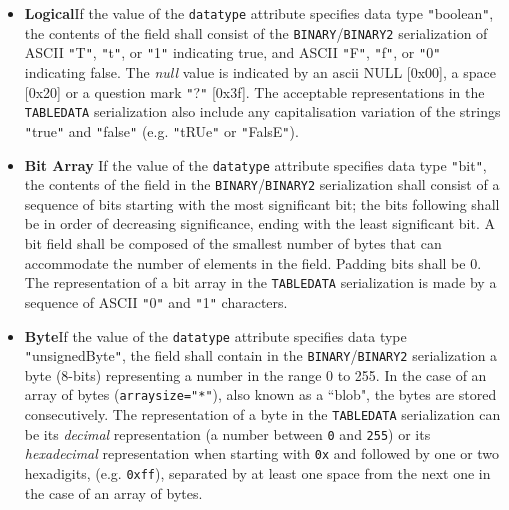 \documentclass[11pt,a4paper]{ivoa}
\let\fg=\color
\def\attr#1{{\tt{\fg{DarkRed}#1}}}
\def\elem#1{{\tt{\fg{DarkRed}#1}}}
\def\attrval#1#2{{\tt{\fg{DarkRed}#1}="{\fg{DarkPurple}#2}"}}
\def\literalvalue#1{{\tt"}{{\fg{DarkPurple}#1}}{\tt"}}
\begin{document}
{\begin{itemize}
\item {\bf Logical}\quad If the value of the {\attr{datatype}}
attribute specifies data type {\literalvalue{boolean}},
the contents of the field{ }shall consist of the \elem{BINARY}/\elem{BINARY2} serialization of
ASCII \literalvalue{T}, \literalvalue{t},  or \literalvalue{1} indicating true, and
ASCII \literalvalue{F}, \literalvalue{f}, or \literalvalue{0} indicating false.
The {\em null} value is indicated by an ascii NULL [0x00],
a space [0x20]
or a question mark \literalvalue{?} [0x3f].
The acceptable representations in the \elem{TABLEDATA} serialization
also include any capitalisation variation of the
strings \literalvalue{true}  and \literalvalue{false} (e.g. \literalvalue{tRUe} or \literalvalue{FalsE}).

\item {\bf Bit Array} \quad If the value of the {\attr{datatype}}
attribute specifies data type {\literalvalue{bit}},
the contents of the field{ }in the \elem{BINARY}/\elem{BINARY2} serialization shall consist of
a sequence of bits starting with the most significant bit; the bits
following shall be in order of decreasing significance, ending with
the least significant bit. A bit field shall be composed of the
smallest number of bytes that can accommodate the number of elements
in the field. Padding bits shall be 0.
The representation of a bit array in the \elem{TABLEDATA} serialization
is made by a sequence of ASCII \literalvalue{0} and \literalvalue{1} characters.

\item {\bf Byte}\quad If the value of the {\attr{datatype}}
attribute specifies data type {\literalvalue{unsignedByte}},
the field shall contain in the \elem{BINARY}/\elem{BINARY2} serialization a byte
(8-bits) representing a number in the
range 0 to 255.
In the case of an array of bytes (\attrval{arraysize}{*}),
also known as a ``blob", the bytes are stored consecutively.
The representation of a byte in the \elem{TABLEDATA} serialization
can be its {\em decimal} representation (a number between {\tt0} and {\tt255})
or its {\em hexadecimal} representation when starting with {\tt0x} and
followed by one or two hexadigits,
(e.g. {\tt0xff}), separated by at least one space from the next one
in the case of an array of bytes.


\end{itemize}}
\end{document}
